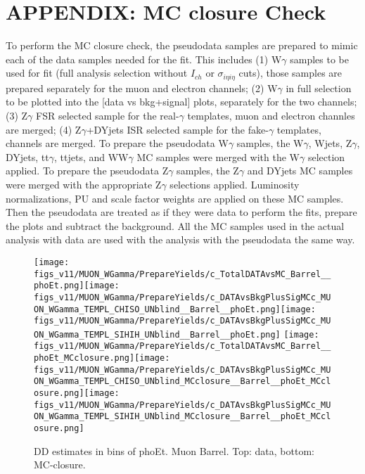 \section{APPENDIX: MC closure Check}
\label{sec:MCclosureCheck}

To perform the MC closure check, the pseudodata samples are prepared to mimic each of the data samples needed for the fit. This includes (1) W$\gamma$ samples to be used for fit (full analysis selection without $I_{ch}$ or $\sigma_{i\eta i\eta}$ cuts), those samples are prepared separately for the muon and electron channels; (2) W$\gamma$ in full selection to be plotted into the [data vs bkg+signal] plots, separately for the two channels; (3) Z$\gamma$ FSR selected sample for the real-$\gamma$ templates, muon and electron channles are merged; (4) Z$\gamma$+DYjets ISR selected sample for the fake-$\gamma$ templates, channels are merged. To prepare the pseudodata W$\gamma$ samples, the W$\gamma$, Wjets, Z$\gamma$, DYjets, tt$\gamma$, ttjets, and WW$\gamma$ MC samples were merged with the W$\gamma$ selection applied. To prepare the pseudodata Z$\gamma$ samples, the Z$\gamma$ and DYjets MC samples were merged with the appropriate Z$\gamma$ selections applied. Luminosity normalizations, PU and scale factor weights are applied on these MC samples.\\   
Then the pseudodata are treated as if they were data to perform the fits, prepare the plots and subtract the background. All the MC samples used in the actual analysis with data are used with the analysis with the pseudodata the same way.\\

\begin{figure}[htb]
  \begin{center}
   \texttt{[image: figs\_v11/MUON\_WGamma/PrepareYields/c\_TotalDATAvsMC\_Barrel\_\_phoEt.png]}\texttt{[image: figs\_v11/MUON\_WGamma/PrepareYields/c\_DATAvsBkgPlusSigMCc\_MUON\_WGamma\_TEMPL\_CHISO\_UNblind\_\_Barrel\_\_phoEt.png]}\texttt{[image: figs\_v11/MUON\_WGamma/PrepareYields/c\_DATAvsBkgPlusSigMCc\_MUON\_WGamma\_TEMPL\_SIHIH\_UNblind\_\_Barrel\_\_phoEt.png]}
   \texttt{[image: figs\_v11/MUON\_WGamma/PrepareYields/c\_TotalDATAvsMC\_Barrel\_\_phoEt\_MCclosure.png]}\texttt{[image: figs\_v11/MUON\_WGamma/PrepareYields/c\_DATAvsBkgPlusSigMCc\_MUON\_WGamma\_TEMPL\_CHISO\_UNblind\_MCclosure\_\_Barrel\_\_phoEt\_MCclosure.png]}\texttt{[image: figs\_v11/MUON\_WGamma/PrepareYields/c\_DATAvsBkgPlusSigMCc\_MUON\_WGamma\_TEMPL\_SIHIH\_UNblind\_MCclosure\_\_Barrel\_\_phoEt\_MCclosure.png]}
  \caption{DD estimates in bins of phoEt. Muon Barrel. Top: data, bottom: MC-closure. }
  \end{center}
\end{figure}

